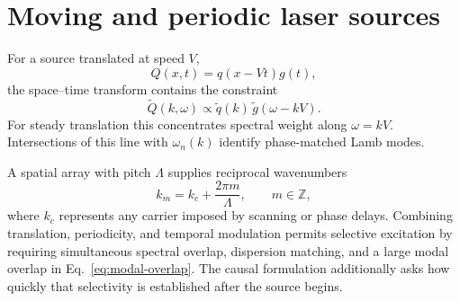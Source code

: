 \section{Moving and periodic laser sources}

For a source translated at speed $V$,
\begin{equation}
 Q(x,t)=q(x-Vt)g(t),
\end{equation}
the space--time transform contains the constraint
\begin{equation}
 \widetilde Q(k,\omega)\propto\widetilde q(k)\,
 \widetilde g(\omega-kV).
\end{equation}
For steady translation this concentrates spectral weight along $\omega=kV$.
Intersections of this line with $\omega_n(k)$ identify phase-matched Lamb modes.

A spatial array with pitch $\Lambda$ supplies reciprocal wavenumbers
\begin{equation}
 k_m=k_c+\frac{2\pi m}{\Lambda},\qquad m\in\mathbb Z,
\end{equation}
where $k_c$ represents any carrier imposed by scanning or phase delays. Combining
translation, periodicity, and temporal modulation permits selective excitation by
requiring simultaneous spectral overlap, dispersion matching, and a large modal
overlap in Eq.~\eqref{eq:modal-overlap}. The causal formulation additionally asks
how quickly that selectivity is established after the source begins.
